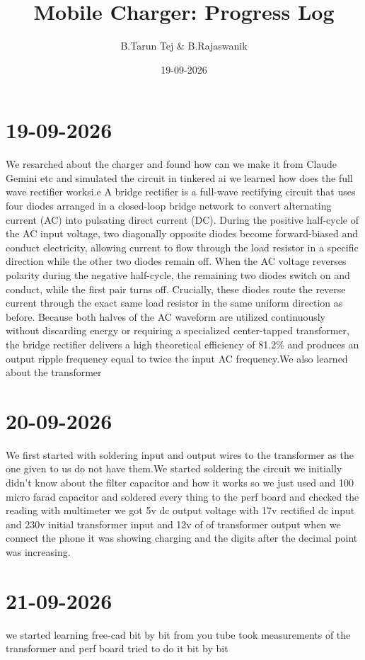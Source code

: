 \documentclass{article}
\title{Mobile Charger: Progress Log}
\author{B.Tarun Tej \& B.Rajaswanik}
\date{19-09-2026}
\begin{document}
	\maketitle
	\section{19-09-2026}
	We resarched about the charger and found how can we make it from Claude Gemini etc and simulated the circuit in tinkered ai
	we learned how does the full wave rectifier works\newline i.e A bridge rectifier is a full-wave rectifying circuit that uses four diodes arranged in a closed-loop bridge network to convert alternating current (AC) into pulsating direct current (DC). During the positive half-cycle of the AC input voltage, two diagonally opposite diodes become forward-biased and conduct electricity, allowing current to flow through the load resistor in a specific direction while the other two diodes remain off. When the AC voltage reverses polarity during the negative half-cycle, the remaining two diodes switch on and conduct, while the first pair turns off. Crucially, these diodes route the reverse current through the exact same load resistor in the same uniform direction as before. Because both halves of the AC waveform are utilized continuously without discarding energy or requiring a specialized center-tapped transformer, the bridge rectifier delivers a high theoretical efficiency of 81.2\% and produces an output ripple frequency equal to twice the input AC frequency.We also learned about the transformer
	\section{20-09-2026}
	We first started with soldering input and output wires to the transformer as the one given to us do not have them.We started soldering the circuit we initially didn't know about the filter capacitor and how it works so we just used and 100 micro farad capacitor and soldered every thing to the perf board and checked the  reading with multimeter we got 5v dc output voltage with 17v rectified dc input and 230v initial transformer input and 12v of of transformer output when we connect the phone it was showing charging and the digits after the decimal point was increasing.
	\section{21-09-2026}
	we started learning free-cad bit by bit from you tube took measurements of the transformer and perf board  tried to do it bit by bit
\end{document}
